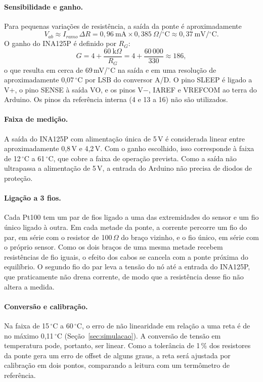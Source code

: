 \documentclass[a4paper,11pt]{article}
\begin{document}
\paragraph{Sensibilidade e ganho.} Para pequenas variações de resistência, a saída da ponte é aproximadamente
\begin{equation}
  V_{ab} \approx I_{ramo}\,\Delta R = 0{,}96\ \text{mA} \times 0{,}385\ \Omega/{}^\circ\text{C} \approx 0{,}37\ \text{mV}/{}^\circ\text{C}.
\end{equation}
O ganho do INA125P é definido por $R_G$:
\begin{equation}
  G = 4 + \frac{60\ \text{k}\Omega}{R_G} = 4 + \frac{60\,000}{330} \approx 186,
\end{equation}
o que resulta em cerca de 69\,mV/\ensuremath{^\circ}C na saída e em uma resolução de aproximadamente 0,07\,\ensuremath{^\circ}C por LSB do conversor A/D. O pino SLEEP é ligado a V+, o pino SENSE à saída VO, e os pinos V$-$, IAREF e VREFCOM ao terra do Arduino. Os pinos da referência interna (4 e 13 a 16) não são utilizados.

\paragraph{Faixa de medição.} A saída do INA125P com alimentação única de 5\,V é considerada linear entre aproximadamente 0,8\,V e 4,2\,V. Com o ganho escolhido, isso corresponde à faixa de 12\,\ensuremath{^\circ}C a 61\,\ensuremath{^\circ}C, que cobre a faixa de operação prevista. Como a saída não ultrapassa a alimentação de 5\,V, a entrada do Arduino não precisa de diodos de proteção.

\paragraph{Ligação a 3 fios.} Cada Pt100 tem um par de fios ligado a uma das extremidades do sensor e um fio único ligado à outra. Em cada metade da ponte, a corrente percorre um fio do par, em série com o resistor de 100\,$\Omega$ do braço vizinho, e o fio único, em série com o próprio sensor. Como os dois braços de uma mesma metade recebem resistências de fio iguais, o efeito dos cabos se cancela com a ponte próxima do equilíbrio. O segundo fio do par leva a tensão do nó até a entrada do INA125P, que praticamente não drena corrente, de modo que a resistência desse fio não altera a medida.

\paragraph{Conversão e calibração.} Na faixa de 15\,\ensuremath{^\circ}C a 60\,\ensuremath{^\circ}C, o erro de não linearidade em relação a uma reta é de no máximo 0,11\,\ensuremath{^\circ}C (Seção~\ref{sec:simulacao}). A conversão de tensão em temperatura pode, portanto, ser linear. Como a tolerância de 1\,\% dos resistores da ponte gera um erro de offset de alguns graus, a reta será ajustada por calibração em dois pontos, comparando a leitura com um termômetro de referência.
\end{document}
